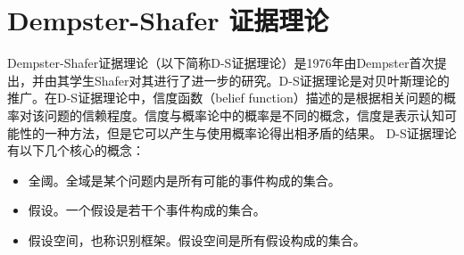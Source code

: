\section{Dempster-Shafer 证据理论}
Dempster-Shafer证据理论（以下简称D-S证据理论）是1976年由Dempster首次提出，并由其学生Shafer对其进行了进一步的研究。D-S证据理论是对贝叶斯理论的推广。在D-S证据理论中，信度函数（belief function）描述的是根据相关问题的概率对该问题的信赖程度。信度与概率论中的概率是不同的概念，信度是表示认知可能性的一种方法，但是它可以产生与使用概率论得出相矛盾的结果。
D-S证据理论有以下几个核心的概念：

\begin{itemize}

\item 全阈。全域是某个问题内是所有可能的事件构成的集合。
\item 假设。一个假设是若干个事件构成的集合。
\item 假设空间，也称识别框架。假设空间是所有假设构成的集合。


\end{itemize}